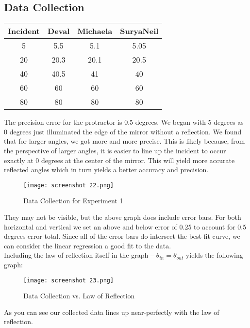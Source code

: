 \documentclass[svgnames]{article}     %
\begin{document}
\subsection{Data Collection}
\mbox{}  
\begin{center}
\begin{tabular}{ |c|c|c|c| }
 \hline
 Incident & Deval  & Michaela & SuryaNeil\\ 
 \hline
 5 & 5.5 & 5.1 & 5.05 \\ 
 \hline
 20 & 20.3 & 20.1 & 20.5 \\
 \hline
 40 & 40.5 & 41 & 40 \\
 \hline
 60 & 60 & 60 & 60 \\
 \hline
 80 & 80 & 80 & 80 \\
 \hline
\end{tabular}
\end{center}

The precision error for the protractor is 0.5 degrees. We began with 5 degrees
as 0 degrees just illuminated the edge of the mirror without a reflection. We
found that for larger angles, we got more and more precise. This is likely
because, from the perspective of larger angles, it is easier to line up the
incident to occur exactly at 0 degrees at the center of the mirror. This will
yield more accurate reflected angles which in turn yields a better accuracy and
precision. 


\begin{figure}[H]
  \centering
    \texttt{[image: screenshot 22.png]}
    \caption{Data Collection for Experiment 1}
\end{figure}

They may not be visible, but the above graph does include error bars. For both
horizontal and vertical we set an above and below error of 0.25 to account for
0.5 degrees error total. Since all of the error bars do intersect the best-fit
  curve, we can consider the linear regression a good fit to the data. \\

Including the law of reflection itself in the graph -- $\theta_{in}
= \theta_{out}$ yields the following graph: 

\begin{figure}[H]
  \centering
    \texttt{[image: screenshot 23.png]}

    \caption{Data Collection vs. Law of Reflection}
\end{figure}

As you can see our collected data lines up near-perfectly with the law of
reflection. \\
\end{document}
